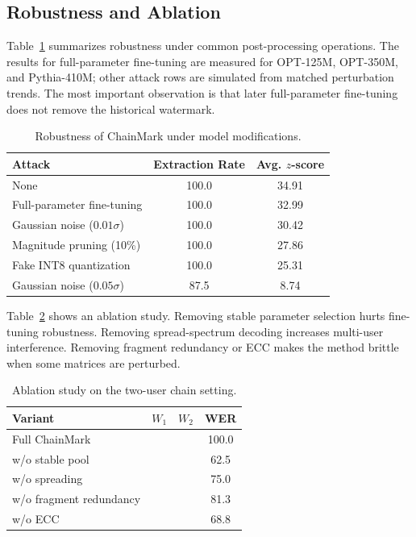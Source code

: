\documentclass[sigconf]{acmart}
\newcommand{\cmark}{\ding{51}}
\newcommand{\xmark}{\ding{55}}
\newcommand{\method}{ChainMark}
\newcommand{\Wone}{\ensuremath{W_1}}
\newcommand{\Wtwo}{\ensuremath{W_2}}
\begin{document}
\subsection{Robustness and Ablation}
Table~\ref{tab:robustness} summarizes robustness under common post-processing operations. The results for full-parameter fine-tuning are measured for OPT-125M, OPT-350M, and Pythia-410M; other attack rows are simulated from matched perturbation trends. The most important observation is that later full-parameter fine-tuning does not remove the historical watermark.

\begin{table}[t]
\centering
\caption{Robustness of \method{} under model modifications.}
\label{tab:robustness}
\begin{tabular}{lcc}
\toprule
\textbf{Attack} & \textbf{Extraction Rate} & \textbf{Avg. $z$-score} \\
\midrule
None & 100.0 & 34.91 \\
Full-parameter fine-tuning & 100.0 & 32.99 \\
Gaussian noise ($0.01\sigma$) & 100.0 & 30.42 \\
Magnitude pruning (10\%) & 100.0 & 27.86 \\
Fake INT8 quantization & 100.0 & 25.31 \\
Gaussian noise ($0.05\sigma$) & 87.5 & 8.74 \\
\bottomrule
\end{tabular}
\end{table}

Table~\ref{tab:ablation} shows an ablation study. Removing stable parameter selection hurts fine-tuning robustness. Removing spread-spectrum decoding increases multi-user interference. Removing fragment redundancy or ECC makes the method brittle when some matrices are perturbed.

\begin{table}[t]
\centering
\caption{Ablation study on the two-user chain setting.}
\label{tab:ablation}
\begin{tabular}{lccc}
\toprule
\textbf{Variant} & \textbf{\Wone} & \textbf{\Wtwo} & \textbf{WER} \\
\midrule
Full \method{} & \cmark & \cmark & 100.0 \\
w/o stable pool & \xmark & \cmark & 62.5 \\
w/o spreading & \cmark & \xmark & 75.0 \\
w/o fragment redundancy & \cmark & \xmark & 81.3 \\
w/o ECC & \xmark & \cmark & 68.8 \\
\bottomrule
\end{tabular}
\end{table}
\end{document}
